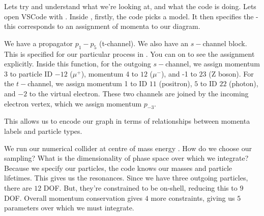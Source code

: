 Lets try and understand what we're looking at, and what the code is doing. Lets open VSCode with . Inside , firstly, the code picks a model. It then specifies the  - this corresponds to an assignment of momenta to our diagram.
\begin{center}
\end{center}

We have a propagator $p_1-p_5$ (t-channel). We also have an $s-$channel block. This is specified for our particular process in . You can  on   to see the assignment explicitly. Inside this function, for the outgoing $s-$channel,  we assign momentum 3 to particle ID $-12$ ($\mu^+$), momentum 4 to $12$ ($\mu^-$), and -1 to $23$ (Z boson). For the $t-$channel, we assign momentum 1 to ID $11$ (positron), $5$ to ID $22$ (photon), and $-2$ to the virtual electron. These two channels are joined by the incoming electron vertex, which we assign momentum $p_{-3}$.

This allows us to encode our graph in terms of relationships between momenta labels and particle types.

We run our numerical collider at centre of mass energy . 
How do we choose our sampling? What is the dimensionality of phase space over which we integrate? Because we specify our particles, the code knows our masses and particle lifetimes. This gives us the resonances. Since we have three outgoing particles, there are $12$ DOF. But, they're constrained to be on-shell, reducing this to $9$ DOF. Overall momentum conservation gives $4$ more constraints, giving us $5$ parameters over which we must integrate.

